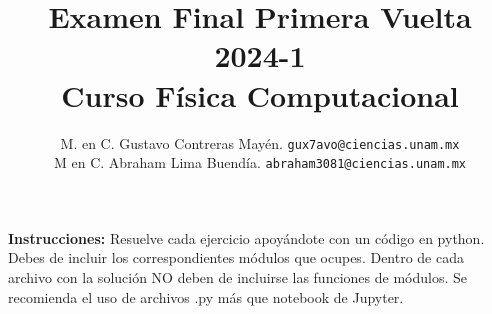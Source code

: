 
\usepackage[siunitx]{circuitikz}
\usetikzlibrary{patterns, arrows, decorations.markings}

\author{M. en C. Gustavo Contreras Mayén. \texttt{gux7avo@ciencias.unam.mx} \\
M en C. Abraham Lima Buendía. \texttt{abraham3081@ciencias.unam.mx}}
\title{Examen Final Primera Vuelta 2024-1 \\ {\large Curso Física Computacional}}
\date{ }


\maketitle
\fontsize{14}{14}\selectfont

\textbf{Instrucciones: } Resuelve cada ejercicio apoyándote con un código en python. Debes de incluir los correspondientes módulos que ocupes. Dentro de cada archivo con la solución NO deben de incluirse las funciones de módulos. Se recomienda el uso de archivos .py más que notebook de Jupyter.

